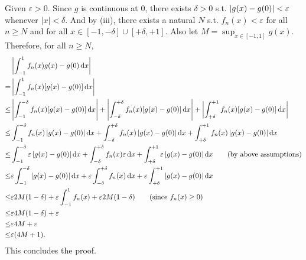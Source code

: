 \documentclass[12pt]{article}
\begin{document}
\begin{fproof}[3]
  Given \(\varepsilon>0\).
  Since \(g\) is continuous at 0, there exists \(\delta>0\) s.t. \(\left\lvert g(x)- g(0) \right\rvert<\varepsilon\) whenever \(|x| < \delta\).
  And by (iii), there exists a natural \(N\) s.t. \(f_n(x) < \varepsilon\) for all \(n \geq N\) and for all \(x \in [-1, -\delta] \cup [+\delta, +1]\).
  Also let \(M = \sup_{x \in [-1,1]} g(x)\).
  Therefore, for all \(n \geq N\),
  \begin{align*}
    &\abs{\int_{-1}^{1}f_n(x)g(x) - g(0) \dx}\\
   =& \abs{\int_{-1}^{1}f_n(x)[g(x)-g(0)] \dx}\\
   \leq & \abs{\int_{-1}^{-\delta} f_n(x)[g(x)-g(0)] \dx} + \abs{\int_{-\delta}^{+\delta} f_n(x)[g(x)-g(0)]\dx} + \abs{\int_{+\delta}^{+1} f_n(x)[g(x)-g(0)]\dx}\\
   \leq &\int_{-1}^{-\delta} f_n(x)\abs{g(x)-g(0)}\dx + \int_{-\delta}^{+\delta} f_n(x)\abs{g(x)-g(0)}\dx + \int_{+\delta}^{+1} f_n(x)\abs{g(x)-g(0)}\dx\\
   \leq& \int_{-1}^{-\delta} \varepsilon\abs{g(x)-g(0)}\dx + \int_{-\delta}^{+\delta} f_n(x) \varepsilon \dx + \int_{+\delta}^{+1} \varepsilon\abs{g(x)-g(0)}\dx \tag{by above assumptions}\\
   \leq& \varepsilon\int_{-1}^{-\delta} \abs{g(x)-g(0)}\dx + \varepsilon\int_{-\delta}^{+\delta} f_n(x) \dx + \varepsilon\int_{+\delta}^{+1}\abs{g(x)-g(0)}\dx\\
   \leq & \varepsilon 2M(1-\delta) + \varepsilon \int_{-1}^{1} f_n(x) + \varepsilon 2M(1-\delta) \tag{since \(f_n(x) \geq 0\)}\\
   \leq & \varepsilon4M(1-\delta) + \varepsilon\\
   \leq & \varepsilon4M + \varepsilon\\
   \leq & \varepsilon(4M+1).
  \end{align*}
  This concludes the proof.

\end{fproof}
\newpage
\end{document}
